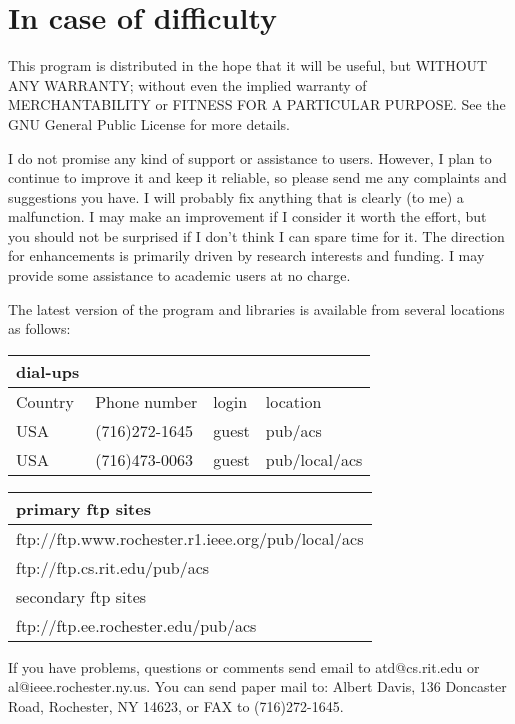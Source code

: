 \section{In case of difficulty}

This program is distributed in the hope that it will be useful, but WITHOUT
ANY WARRANTY; without even the implied warranty of MERCHANTABILITY or
FITNESS FOR A PARTICULAR PURPOSE.  See the GNU General Public License for
more details.

I do not promise any kind of support or assistance to users.  However, I
plan to continue to improve it and keep it reliable, so please send me any
complaints and suggestions you have.  I will probably fix anything that is
clearly (to me) a malfunction.  I may make an improvement if I consider it
worth the effort, but you should not be surprised if I don't think I can
spare time for it.  The direction for enhancements is primarily driven by
research interests and funding.  I may provide some assistance to academic
users at no charge.

The latest version of the program and libraries is available from
several locations as follows:

\begin{tabular}{|l|l|l|l|}
\hline
dial-ups \\
\hline
Country & Phone number	& login	& location \\
\hline
USA	& (716)272-1645	& guest	& pub/acs \\
USA	& (716)473-0063	& guest	& pub/local/acs \\
\hline
\end{tabular}

\begin{tabular}{|l|}
\hline
primary ftp sites \\
\hline
ftp://ftp.www.rochester.r1.ieee.org/pub/local/acs \\
ftp://ftp.cs.rit.edu/pub/acs \\
\hline
secondary ftp sites \\
\hline
ftp://ftp.ee.rochester.edu/pub/acs \\
\hline
\end{tabular}

If you have problems, questions or comments send email to atd@cs.rit.edu
or al@ieee.rochester.ny.us.  You can send paper mail to: Albert
Davis, 136 Doncaster Road, Rochester, NY 14623, or FAX to (716)272-1645.
